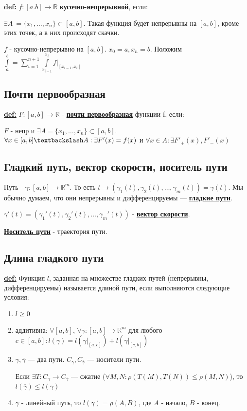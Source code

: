 \documentclass{article}
\newcommand{\integral}[2]{\displaystyle\int\limits_{#1}^{#2}}
\newcommand{\deff}[1]{\underline{\textbf{#1}}}
\begin{document}
\deff{def:} $f:[a.b] \rightarrow \mathbb{R}$ \deff{кусочно-непрерывной}, если:

$\exists A \ = \{x_1,\ldots,x_n\} \subset [a,b]$. Такая функция будет непрерывны на $[a,b]$, кроме этих точек, а в них происходят скачки.

$f$ - кусочно-непрерывно на $[a,b]$. $x_0 = a, x_n = b$. Положим $\integral{a}{b} = \sum\limits_{i=1}^{n+1}\integral{x_{i-1}}{x_i}f\Big|_{[x_{i-1},x_i]}$

\subsection{Почти первообразная}

\deff{def:} $F:[a,b] \rightarrow \mathbb{R}$ - \deff{почти первообразная} функции f, если:

$F$ - непр и $\exists A = \{x_1,\ldots,x_n\} \subset[a,b]$.
$\forall x \in [a,b] \textbackslash A: \exists F'(x) = f(x)$ и $\forall x \in A: \exists F'_+(x),F'_-(x)$

\subsection{Гладкий путь, вектор скорости, носитель пути}


Путь - $\gamma :[a,b] \rightarrow \mathbb{R}^m$. То есть $t\rightarrow (\gamma_1(t),\gamma_2(t),\ldots,\gamma_m(t)) = \gamma(t)$. Мы обычно думаем, что они непрерывны и дифференцируемы --- \deff{гладкие пути}.


$\gamma'(t) = (\gamma_1'(t),\gamma_2'(t),\ldots,\gamma_m'(t))$ - \deff{вектор скорости}.

\deff{Носитель пути} - траектория пути.

\subsection{Длина гладкого пути}

\deff{def:} Функция $l$, заданная на множестве гладких путей (непрерывны, дифференцируемы) называется длиной пути, если выполняются следующие условия:

\begin{enumerate}
    \item $l\geq 0$
    \item аддитивна: $\forall [a,b]$, $\forall \gamma:[a,b]\rightarrow\mathbb{R}^m$ для любого $c\in [a,b]: l(\gamma) = l(\gamma\Big|_{[a,c]}) + l(\gamma\Big|_{[c,b]})$
    \item $\gamma, \overline{\gamma}$ --- два пути. $C_{\gamma},C_{\overline{\gamma}}$ --- носители пути.
    
    Если $\exists T: C_{\gamma} \rightarrow C_{\overline{\gamma}}$ --- сжатие ($\forall M,N:\rho(T(M), T(N))\leq \rho(M,N)$), то $l(\overline{\gamma})\leq l(\gamma)$
    \item $\gamma$ - линейный путь, то $l(\gamma) = \rho(A,B)$, где $A$ - начало, $B$ - конец.
\end{enumerate}
\end{document}
